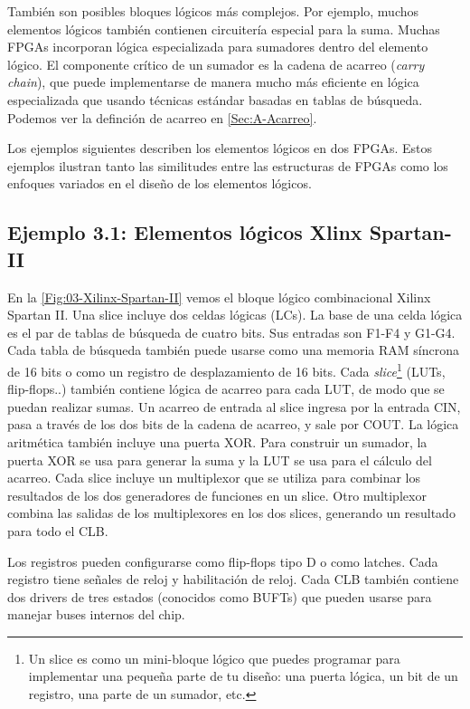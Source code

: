 También son posibles bloques lógicos más complejos. Por ejemplo, muchos elementos lógicos también contienen circuitería especial para la suma. Muchas FPGAs incorporan lógica especializada para sumadores dentro del elemento lógico. El componente crítico de un sumador es la cadena de acarreo (\textit{carry chain}), que puede implementarse de manera mucho más eficiente en lógica especializada que usando técnicas estándar basadas en tablas de búsqueda. Podemos ver la definción de acarreo en \cref{Sec:A-Acarreo}. 

Los ejemplos siguientes describen los elementos lógicos en dos FPGAs. Estos ejemplos ilustran tanto las similitudes entre las estructuras de FPGAs como los enfoques variados en el diseño de los elementos lógicos.


\vspace*{1em}

\begin{Ejemplo}
\subsection*{Ejemplo 3.1: Elementos lógicos Xlinx Spartan-II}
\end{Ejemplo}

En la \cref{Fig:03-Xilinx-Spartan-II} vemos el bloque lógico combinacional Xilinx Spartan II. Una slice incluye dos celdas lógicas (LCs). La base de una celda lógica es el par de tablas de búsqueda de cuatro bits. Sus entradas son F1-F4 y G1-G4. Cada tabla de búsqueda también puede usarse como una memoria RAM síncrona de 16 bits o como un registro de desplazamiento de 16 bits. Cada \textit{slice}\footnote{Un slice es como un mini-bloque lógico que puedes programar para implementar una pequeña parte de tu diseño: una puerta lógica, un bit de un registro, una parte de un sumador, etc.}  (LUTs, flip-flops..) también contiene lógica de acarreo para cada LUT, de modo que se puedan realizar sumas. Un acarreo de entrada al slice ingresa por la entrada CIN, pasa a través de los dos bits de la cadena de acarreo, y sale por COUT. La lógica aritmética también incluye una puerta XOR. Para construir un sumador, la puerta XOR se usa para generar la suma y la LUT se usa para el cálculo del acarreo. Cada slice incluye un multiplexor que se utiliza para combinar los resultados de los dos generadores de funciones en un slice. Otro multiplexor combina las salidas de los multiplexores en los dos slices, generando un resultado para todo el CLB.

Los registros pueden configurarse como flip-flops tipo D o como latches. Cada registro tiene señales de reloj y habilitación de reloj. Cada CLB también contiene dos drivers de tres estados (conocidos como BUFTs) que pueden usarse para manejar buses internos del chip.

